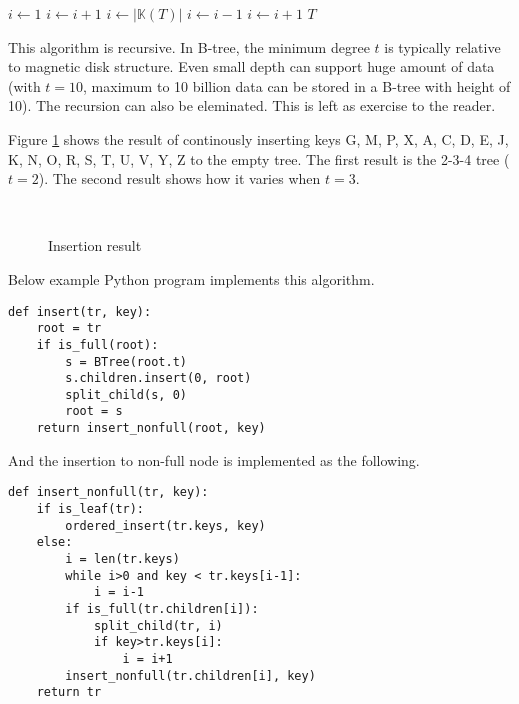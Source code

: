 \documentclass{article}
\begin{document}
\begin{algorithmic}[1]
    \State $i \gets 1$
      \State $i \gets i+1$
    \EndWhile
    \State {}
  \Else
    \State $i \gets |\mathbb{K}(T)|$
      \State $i \gets i-1$
    \EndWhile
      \State {}
        \State $i \gets i+1$
      \EndIf
    \EndIf
    \State {}
  \EndIf
  \State \Return $T$
\EndFunction
\end{algorithmic}

This algorithm is recursive. In B-tree,
the minimum degree $t$ is typically relative to magnetic disk structure.
Even small depth can support huge amount of data
(with $t=10$, maximum to 10 billion data can be stored in a B-tree with height of 10).
The recursion can also be eleminated. This is left as exercise to the reader.

Figure \ref{fig:btree-insert} shows the result of continously inserting
keys G, M, P, X, A, C, D, E, J, K, N, O, R, S, T, U, V, Y, Z to the empty tree.
The first result is the 2-3-4 tree ($t=2$). The second result shows how
it varies when $t=3$.

\begin{figure}[htbp]
  \centering
  \\
  \caption{Insertion result} \label{fig:btree-insert}
\end{figure}

Below example Python program implements this algorithm.
\lstset{language=Python}
\begin{lstlisting}
def insert(tr, key):
    root = tr
    if is_full(root):
        s = BTree(root.t)
        s.children.insert(0, root)
        split_child(s, 0)
        root = s
    return insert_nonfull(root, key)
\end{lstlisting}

And the insertion to non-full node is implemented as the following.

\begin{lstlisting}
def insert_nonfull(tr, key):
    if is_leaf(tr):
        ordered_insert(tr.keys, key)
    else:
        i = len(tr.keys)
        while i>0 and key < tr.keys[i-1]:
            i = i-1
        if is_full(tr.children[i]):
            split_child(tr, i)
            if key>tr.keys[i]:
                i = i+1
        insert_nonfull(tr.children[i], key)
    return tr
\end{lstlisting}
\end{document}
